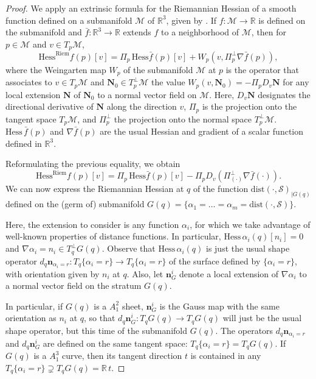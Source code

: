 \documentclass[11pt]{article}
\newcommand{\R}{\mathbb{R}}
\newcommand{\nbf}{\mathbf{n}}
\newcommand{\dist}{\mathrm{dist}}
\newcommand{\Surf}{\mathcal{S}}
\newcommand{\grad}{\nabla}
\newcommand{\Hess}{\mathrm{Hess}}
\theoremstyle{plain}
\theoremstyle{definition}
\theoremstyle{remark}
\begin{document}
	\begin{proof}
		
		We apply an extrinsic formula for the Riemannian Hessian of a smooth function defined on a submanifold $\mathcal{M}$ of $\R^3$, given by \cite{absil_extrinsic_2013}. If $f : \mathcal{M} \to \R$ is defined on the submanifold and $\bar{f} : \R^3 \to \R$ extends $f$ to a neighborhood of $\mathcal{M}$, then for $p \in \mathcal{M}$ and $v \in T_p \mathcal{M}$,
		\[\Hess^{\mathrm{Riem}} f(p)[v] = \Pi_p \, \Hess \bar{f}(p)[v] + W_p(v, \Pi_p^\perp \grad \bar{f}(p) ),\]
		where the Weingarten map $W_p$ of the submanifold $\mathcal{M}$ at $p$ is the operator that associates to $v \in T_p \mathcal{M}$ and $ \mathbf{N}_0 \in T_p^\perp \mathcal{M}$ the value $W_p(v, \mathbf{N}_0) = - \Pi_p D_v \mathbf{N}$ for any local extension $\mathbf{N}$ of $\mathbf{N}_0$ to a normal vector field on $\mathcal{M}$. Here, $D_v \mathbf{N}$ designates the directional derivative of $\mathbf{N}$ along the direction $v$, $\Pi_p$ is the projection onto the tangent space $T_p \mathcal{M}$, and $\Pi_p^\perp$ the projection onto the normal space $T_p^\perp \mathcal{M}$.
		$\Hess \, \bar{f}(p)$ and $\grad \bar{f} (p)$ are the usual Hessian and gradient of a scalar function defined in $\R^3$.
		
		Reformulating the previous equality, we obtain
		\[\Hess^{\mathrm{Riem}} f(p)[v] = \Pi_p \, \Hess \bar{f}(p)[v] - 
		\Pi_p D_v (\Pi_{(\cdot)}^\perp \grad \bar{f}(\cdot)).\]
		We can now express the Riemannian Hessian at $q$ of the function $\dist(\cdot, \Surf)_{|G(q)}$ defined on the (germ of) submanifold $G(q) = \{\alpha_1 = \ldots = \alpha_m = \dist(\cdot, \Surf)\}$. 
		
		Here, the extension to consider is any function $\alpha_i$, for which we take advantage of well-known properties of distance functions.
		In particular, $\Hess \, \alpha_i(q) [n_i] = 0$ and $\grad \alpha_i = n_i \in T_q^\perp G(q)$.  Observe that $\Hess \, \alpha_i(q)$ is just the usual shape operator $d_q \nbf_{\alpha_i = r} : T_q \{\alpha_i = r\} \to T_q \{\alpha_i = r\}$ of the surface defined by $\{\alpha_i = r\}$, with orientation given by $n_i$ at $q$.
		Also, let $\nbf^i_G$ denote a local extension of $\grad \alpha_i$ to a normal vector field on the stratum $G(q)$. 
		
		In particular, if $G(q)$ is a $A_1^2$ sheet, $\nbf^i_G$ is the Gauss map with the same orientation as $n_i$ at $q$, so that $d_q \nbf^i_G : T_q G(q) \to T_q G(q)$ will just be the usual shape operator, but this time of the submanifold $G(q)$. The operators  $d_q \nbf_{\alpha_i = r}$ and $d_q \nbf^i_G$ are defined on the same tangent space: $T_q \{\alpha_i = r\} = T_q G(q)$.
		If $G(q)$ is a $A_1^3$ curve, then its tangent direction $t$ is contained in any $T_q \{\alpha_i = r\} \supsetneq T_q G(q) = \R\, t$.
		

\end{proof}
\end{document}
